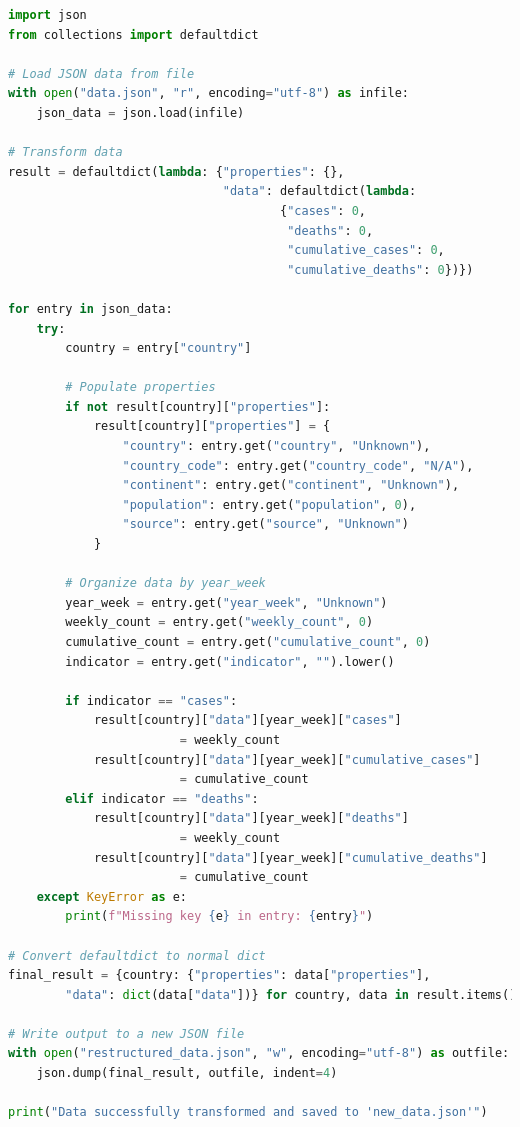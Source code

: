 \documentclass{report}
\begin{document}
\begin{lstlisting}[language=Python]
import json
from collections import defaultdict

# Load JSON data from file
with open("data.json", "r", encoding="utf-8") as infile:
    json_data = json.load(infile)

# Transform data
result = defaultdict(lambda: {"properties": {},
                              "data": defaultdict(lambda:
                                      {"cases": 0,
                                       "deaths": 0,
                                       "cumulative_cases": 0,
                                       "cumulative_deaths": 0})})

for entry in json_data:
    try:
        country = entry["country"]
        
        # Populate properties
        if not result[country]["properties"]:
            result[country]["properties"] = {
                "country": entry.get("country", "Unknown"),
                "country_code": entry.get("country_code", "N/A"),
                "continent": entry.get("continent", "Unknown"),
                "population": entry.get("population", 0),
                "source": entry.get("source", "Unknown")
            }

        # Organize data by year_week
        year_week = entry.get("year_week", "Unknown")
        weekly_count = entry.get("weekly_count", 0)
        cumulative_count = entry.get("cumulative_count", 0)
        indicator = entry.get("indicator", "").lower()

        if indicator == "cases":
            result[country]["data"][year_week]["cases"]
                        = weekly_count
            result[country]["data"][year_week]["cumulative_cases"]
                        = cumulative_count
        elif indicator == "deaths":
            result[country]["data"][year_week]["deaths"]
                        = weekly_count
            result[country]["data"][year_week]["cumulative_deaths"]
                        = cumulative_count
    except KeyError as e:
        print(f"Missing key {e} in entry: {entry}")

# Convert defaultdict to normal dict
final_result = {country: {"properties": data["properties"],
        "data": dict(data["data"])} for country, data in result.items()}

# Write output to a new JSON file
with open("restructured_data.json", "w", encoding="utf-8") as outfile:
    json.dump(final_result, outfile, indent=4)

print("Data successfully transformed and saved to 'new_data.json'")
\end{lstlisting}


\newpage
\end{document}
